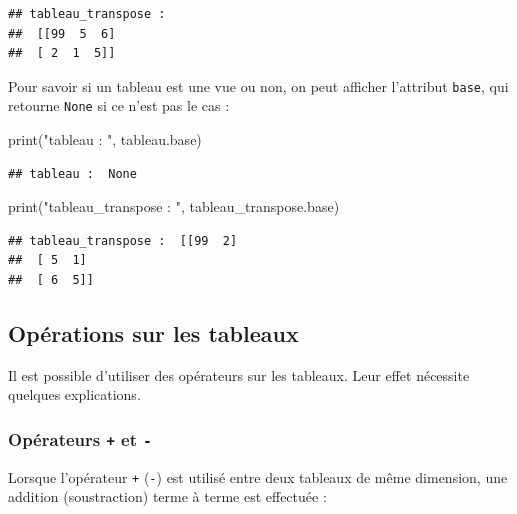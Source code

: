 \documentclass[12pt,]{book}
\newenvironment{Shaded}{\begin{snugshade}}{\end{snugshade}}
\newcommand{\StringTok}[1]{\textcolor[rgb]{0.31,0.60,0.02}{#1}}
\newcommand{\BuiltInTok}[1]{#1}
\newcommand{\NormalTok}[1]{#1}
\numberwithin{equation}{section}
\numberwithin{countremarque}{section}
\begin{document}
\begin{lstlisting}
## tableau_transpose : 
##  [[99  5  6]
##  [ 2  1  5]]
\end{lstlisting}

Pour savoir si un tableau est une vue ou non, on peut afficher
l'attribut \texttt{base}, qui retourne \texttt{None} si ce n'est pas le
cas :

\begin{Shaded}
\begin{Highlighting}[]
\BuiltInTok{print}\NormalTok{(}\StringTok{"tableau : "}\NormalTok{, tableau.base)}
\end{Highlighting}
\end{Shaded}

\begin{lstlisting}
## tableau :  None
\end{lstlisting}

\begin{Shaded}
\begin{Highlighting}[]
\BuiltInTok{print}\NormalTok{(}\StringTok{"tableau_transpose : "}\NormalTok{, tableau_transpose.base)}
\end{Highlighting}
\end{Shaded}

\begin{lstlisting}
## tableau_transpose :  [[99  2]
##  [ 5  1]
##  [ 6  5]]
\end{lstlisting}

\subsection{Opérations sur les tableaux}\label{operations-tableaux}

Il est possible d'utiliser des opérateurs sur les tableaux. Leur effet
nécessite quelques explications.

\subsubsection{\texorpdfstring{Opérateurs \texttt{+} et
\texttt{-}}{Opérateurs + et -}}\label{operateurs-et--}

Lorsque l'opérateur \texttt{+} (\texttt{-}) est utilisé entre deux
tableaux de même dimension, une addition (soustraction) terme à terme
est effectuée :
\end{document}
